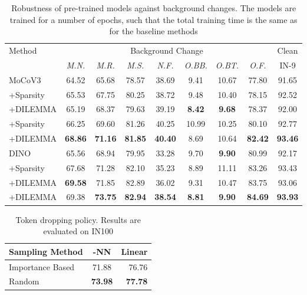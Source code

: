 \documentclass[letterpaper]{article} \usepackage{aaai23}  \usepackage{times}  \usepackage{helvet}  \usepackage{courier}  \usepackage[hyphens]{url}  \usepackage{graphicx} \urlstyle{rm} \def\UrlFont{\rm}  \usepackage{natbib}  \usepackage{caption} \frenchspacing  \setlength{\pdfpagewidth}{8.5in}  \setlength{\pdfpageheight}{11in}  \usepackage{algorithm}
\newcommand{\methodname}{DILEMMA}
\begin{document}
\begin{table*}[t]
\centering
\begin{tabular}{@{}lcccccccc@{}}
\multirow{2}{*}{Method} & \multicolumn{7}{c}{Background Change} & Clean \\
\cmidrule(lr){2-8}\cmidrule(lr){9-9}
& \it M.N. & \it M.R. & \it M.S. & \it N.F. & \it O.BB. & \it O.BT. & \it O.F. & IN-9\\
\toprule
MoCoV3 & 64.52 & 65.68 & 78.57 & 38.69 & 9.41 & 10.67 & 77.80 & 91.65\\
+Sparsity & 65.53 & 67.75 & 80.25 & 38.72 & 9.48 & 10.40 & 78.15 & 92.52\\
+\methodname & 65.19 & 68.37 & 79.63 & 39.19 & \bf 8.42 & \bf 9.68 & 78.37 & 92.00\\
+Sparsity & 66.25 & 69.60 & 81.26 & 40.25 & 10.99 & 10.25 & 80.10 & 92.77\\
+\methodname & \bf 68.86 & \bf 71.16 & \bf 81.85 & \bf 40.40 & 8.69 & 10.64 & \bf 82.42 & \bf 93.46\\
\midrule
DINO & 65.56 & 68.94 & 79.95 & 33.28 & 9.70 & \bf 9.90 & 80.99 & 92.17\\
+Sparsity & 67.68 & 71.28 & 82.10 & 35.23 & 8.89 & 11.11 & 83.26 & 93.43\\
+\methodname & \bf 69.58 & 71.85 & 82.89 & 36.02 & 9.31 & 10.47 & 83.75 & 93.06\\
+\methodname & 69.38 & \bf 73.75 & \bf 82.94 & \bf 38.54 & \bf 8.81 & \bf 9.90 & \bf 84.69 & \bf 93.93\\
\bottomrule
\end{tabular}
\caption{Robustness of pre-trained models against background changes. The  models are trained for a number of epochs, such that the total training time is the same as for the baseline methods}
\label{tab:background}
\end{table*}

\begin{table}[t]
\centering
    \small
\begin{tabular*}{\linewidth}{@{}l@{\extracolsep{\fill}}cr@{}}
\toprule
Sampling Method & -NN & Linear\\
\hline
Importance Based & 71.88 & 76.76\\
Random & \bf 73.98 & \bf 77.78\\
\bottomrule
\end{tabular*}
\caption{Token dropping policy. Results are evaluated on IN100}
\label{tab:drop_policy}
\end{table}
\end{document}

